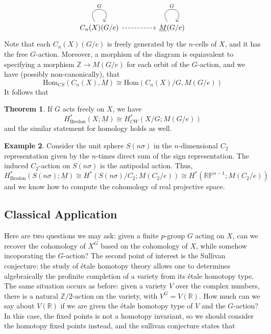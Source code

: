 \documentclass{article}
\theoremstyle{definition}
\newtheorem{theorem}{Theorem}[section] %
\newtheorem{example}[theorem]{Example}
\begin{document}
\[\begin{tikzcd}
	{C_n(X)(G/e)} && {\underline{M}(G/e)}
	\arrow["G", from=1-1, to=1-1, loop, in=55, out=125, distance=10mm]
	\arrow[dashed, from=1-1, to=1-3]
	\arrow["G", from=1-3, to=1-3, loop, in=55, out=125, distance=10mm]
\end{tikzcd}\]
Note that each $C_n(X)(G/e)$ is freely generated by the $n$-cells of $X$, and it has the free $G$-action. Moreover, a morphism of the diagram is equiavalent to specifying a morphism $\mathbb{Z}\to M(G/e)$ for each orbit of the $G$-action, and we have (possibly non-canonically), that 
\[\textrm{Hom}_{CS}(C_n(X),\underline{M})\cong \textrm{Hom}(C_n(X)/G,M(G/e))\]
It follows that 

\begin{tcolorbox}[colback=red!5!white,colframe=red!30!white]
\begin{theorem}
If $G$ acts freely on $X$, we have 
\[H^*_{\textrm{Bredon}}(X;\underline{M})\cong H^*_{CW}(X/G;M(G/e))\]
and the similar statement for homology holds as well. 
\end{theorem}
\end{tcolorbox}


\begin{tcolorbox}[colback=yellow!5!white,colframe=yellow!30!white]
\begin{example}
Consider the unit sphere $S(n\sigma)$ in the $n$-dimensional $C_2$ representation given by the $n$-times direct sum of the sign representation. The induced $C_2$-action on $S(n\sigma)$ is the antipodal action. Thus, 
\[H_{\textrm{Bredon}}^*(S(n\sigma); \underline{M})\cong H^*(S(n\sigma)/C_2;M(C_2/e))\cong H^*(\mathbb{RP}^{n-1};M(C_2/e))\]
and we know how to compute the cohomology of real projective space. 
\end{example}
\end{tcolorbox}








\subsection{Classical Application}
Here are two questions we may ask: given a finite $p$-group $G$ acting on $X$, can we recover the cohomology of $X^G$ based on the cohomology of $X$, while somehow incoporating the $G$-action? The second point of interest is the Sullivan conjecture: the study of \'etale homotopy theory allows one to determines algebraically the profinite completion of a variety from its \'etale homotopy type. The same situation occurs as before: given a variety $V$ over the complex numbers, there is a natural $\mathbb{Z}/2$-action on the variety, with $V^G=V(\mathbb{R})$. How much can we say about $V(\mathbb{R})$ if we are given the \'etale homotopy type of $V$ and the $G$-action? In this case, the fixed points is not a homotopy invariant, so we should consider the homotopy fixed points instead, and the sullivan conjecture states that 
\end{document}
